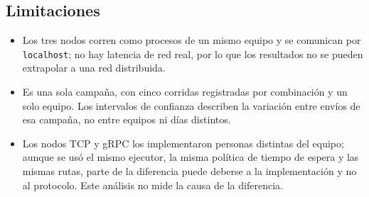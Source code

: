 \subsection{Limitaciones}

\begin{itemize}
  \item Los tres nodos corren como procesos de un mismo equipo y se comunican por \texttt{localhost}; no hay latencia de red real, por lo que los resultados no se pueden extrapolar a una red distribuida.
  \item Es una sola campaña, con cinco corridas registradas por combinación y un solo equipo. Los intervalos de confianza describen la variación entre envíos de esa campaña, no entre equipos ni días distintos.
  \item Los nodos TCP y gRPC los implementaron personas distintas del equipo; aunque se usó el mismo ejecutor, la misma política de tiempo de espera y las mismas rutas, parte de la diferencia puede deberse a la implementación y no al protocolo. Este análisis no mide la causa de la diferencia.
\end{itemize}
